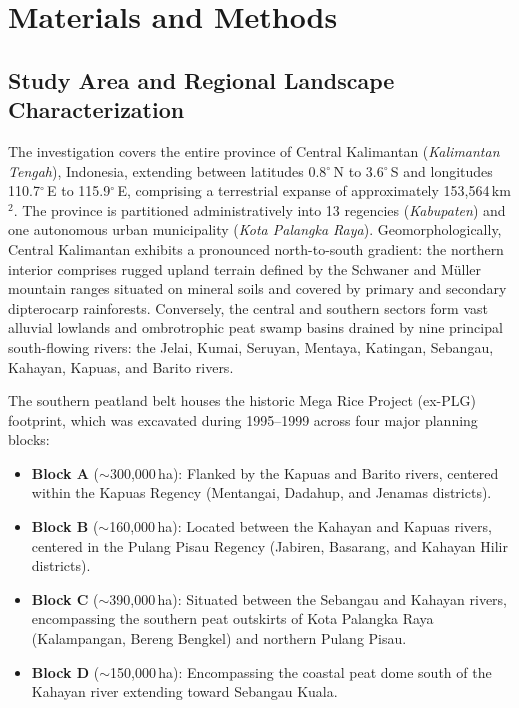 \section{Materials and Methods}
\label{sec:materials_methods}

\subsection{Study Area and Regional Landscape Characterization}
\label{subsec:study_area}

The investigation covers the entire province of Central Kalimantan (\textit{Kalimantan Tengah}), Indonesia, extending between latitudes 0.8$^\circ$\,N to 3.6$^\circ$\,S and longitudes 110.7$^\circ$\,E to 115.9$^\circ$\,E, comprising a terrestrial expanse of approximately 153,564\,km$^2$. The province is partitioned administratively into 13 regencies (\textit{Kabupaten}) and one autonomous urban municipality (\textit{Kota Palangka Raya}). Geomorphologically, Central Kalimantan exhibits a pronounced north-to-south gradient: the northern interior comprises rugged upland terrain defined by the Schwaner and M{\"u}ller mountain ranges situated on mineral soils and covered by primary and secondary dipterocarp rainforests. Conversely, the central and southern sectors form vast alluvial lowlands and ombrotrophic peat swamp basins drained by nine principal south-flowing rivers: the Jelai, Kumai, Seruyan, Mentaya, Katingan, Sebangau, Kahayan, Kapuas, and Barito rivers.

The southern peatland belt houses the historic Mega Rice Project (ex-PLG) footprint, which was excavated during 1995--1999 across four major planning blocks:
\begin{itemize}
    \item \textbf{Block A} ($\sim$300,000\,ha): Flanked by the Kapuas and Barito rivers, centered within the Kapuas Regency (Mentangai, Dadahup, and Jenamas districts).
    \item \textbf{Block B} ($\sim$160,000\,ha): Located between the Kahayan and Kapuas rivers, centered in the Pulang Pisau Regency (Jabiren, Basarang, and Kahayan Hilir districts).
    \item \textbf{Block C} ($\sim$390,000\,ha): Situated between the Sebangau and Kahayan rivers, encompassing the southern peat outskirts of Kota Palangka Raya (Kalampangan, Bereng Bengkel) and northern Pulang Pisau.
    \item \textbf{Block D} ($\sim$150,000\,ha): Encompassing the coastal peat dome south of the Kahayan river extending toward Sebangau Kuala.
\end{itemize}

